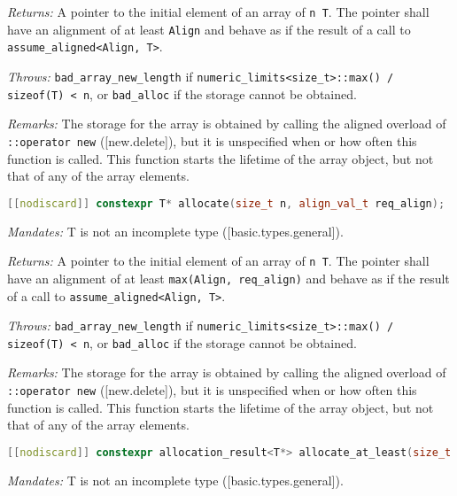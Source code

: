 \documentclass[11pt]{article}
\begin{document}
\noindent
\hangindent=1.05cm\hspace{1cm}\textit{Returns:} A pointer to the initial element of an array of \texttt{n T}. The pointer shall have an alignment of at least \texttt{Align} and behave as if the result of a call to \texttt{assume\_aligned<Align, T>}.

\noindent
\hangindent=1.05cm\hspace{1cm}\textit{Throws:} \texttt{bad\_array\_new\_length} if \texttt{numeric\_limits<size\_t>::max() / sizeof(T) < n}, or \texttt{bad\_alloc} if the storage cannot be obtained.

\noindent
\hangindent=1.05cm\hspace{1cm}\textit{Remarks:} The storage for the array is obtained by calling the aligned overload of \texttt{::operator new} ([new.delete]), but it is unspecified when or how often this function is called. This function starts the lifetime of the array object, but not that of any of the array elements.

\begin{lstlisting}[language=C++, basicstyle=\small]
[[nodiscard]] constexpr T* allocate(size_t n, align_val_t req_align);
\end{lstlisting}

\noindent
\hangindent=1.05cm\hspace{1cm}\textit{Mandates:} T is not an incomplete type ([basic.types.general]).

\noindent
\hangindent=1.05cm\hspace{1cm}\textit{Returns:} A pointer to the initial element of an array of \texttt{n T}. The pointer shall have an alignment of at least \texttt{max(Align, req\_align)} and behave as if the result of a call to \texttt{assume\_aligned<Align, T>}.

\noindent
\hangindent=1.05cm\hspace{1cm}\textit{Throws:} \texttt{bad\_array\_new\_length} if \texttt{numeric\_limits<size\_t>::max() / sizeof(T) < n}, or \texttt{bad\_alloc} if the storage cannot be obtained.

\noindent
\hangindent=1.05cm\hspace{1cm}\textit{Remarks:} The storage for the array is obtained by calling the aligned overload of \texttt{::operator new} ([new.delete]), but it is unspecified when or how often this function is called. This function starts the lifetime of the array object, but not that of any of the array elements.

\begin{lstlisting}[language=C++, basicstyle=\small]
[[nodiscard]] constexpr allocation_result<T*> allocate_at_least(size_t n); 
\end{lstlisting}
\noindent
\hangindent=1.05cm\hspace{1cm}\textit{Mandates:} T is not an incomplete type ([basic.types.general]).
\end{document}
